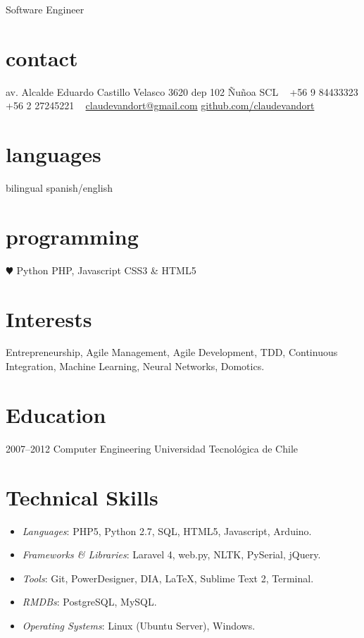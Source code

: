 \documentclass[]{friggeri-cv}
\begin{document}
       {Software Engineer}


\begin{aside}
  \section{contact}
    av. Alcalde Eduardo
    Castillo Velasco
    3620 dep 102
    Ñuñoa
    SCL
    ~
    +56 9 84433323
    +56 2 27245221
    ~
    \href{mailto:claudevandort@gmail.com}{claudevandort@gmail.com}
    \href{https://github.com/claudevandort}{github.com/claudevandort}
  \section{languages}
    bilingual spanish/english
  \section{programming}
    {\color{red} $\varheartsuit$} Python
    PHP, Javascript
    CSS3 \& HTML5
\end{aside}

\section{Interests}

Entrepreneurship, Agile Management, Agile Development, TDD, Continuous Integration, Machine Learning, Neural Networks, Domotics.

\section{Education}

\begin{entrylist}
  \entry
    {2007–2012}
    {Computer Engineering}
    {Universidad Tecnológica de Chile}
    {\emph{}}
\end{entrylist}

\section{Technical Skills}

\begin{itemize}
\item \emph{Languages}: PHP5, Python 2.7, SQL, HTML5, Javascript, Arduino.
\item \emph{Frameworks \& Libraries}: Laravel 4, web.py, NLTK, PySerial, jQuery.
\item \emph{Tools}: Git, PowerDesigner, DIA, \LaTeX, Sublime Text 2, Terminal.
\item \emph{RMDBs}: PostgreSQL, MySQL.
\item \emph{Operating Systems}: Linux (Ubuntu Server), Windows.
\end{itemize}
\end{document}
